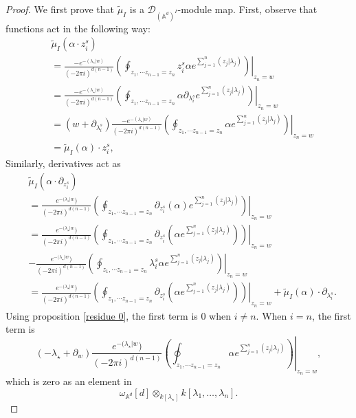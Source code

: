 \documentclass[11pt]{amsart}
\theoremstyle{definition}
\theoremstyle{remark}
\numberwithin{equation}{section}
\begin{document}
\begin{proof}
    We first prove that $\tilde{\mu}_{ I}$ is a $\mathcal{D}_{(\mathbb{A}^{d})^{ I}}$-module map.
    First, observe that functions act in the following way:
    \begin{align*}
        &\tilde{\mu}_{ I}(\alpha\cdot z_{i}^{s})\\
        &=
        \frac{-e^{-(\lambda_{\star}| w)}}{(-2\pi i)^{d(n-1)}}\left.\left(\oint_{z_{1},\cdots z_{n-1}=z_{n}}z_{i}^{s}\alpha e^{\sum\limits_{j=1}^{n}(z_{j}|\lambda_{j})}\right)\right|_{z_n=w}\\
        &=
        \frac{-e^{-(\lambda_{\star}| w)}}{(-2\pi i)^{d(n-1)}}\left.\left(\oint_{z_{1},\cdots z_{n-1}=z_{n}}\alpha \partial_{\lambda_{i}^{s}}e^{\sum\limits_{j=1}^{n}(z_{j}|\lambda_{j})}\right)\right|_{z_n=w}\\
        &=(w+\partial_{\lambda_{i}^{s}})\frac{-e^{-(\lambda_{\star}| w)}}{(-2\pi i)^{d(n-1)}}\left.\left(\oint_{z_{1},\cdots z_{n-1}=z_{n}}\alpha e^{\sum\limits_{j=1}^{n}(z_{j}|\lambda_{j})}\right)\right|_{z_n=w}\\
        &=
        \tilde{\mu}_{ I}(\alpha)\cdot z_{i}^{s},
    \end{align*}
    Similarly, derivatives act as
    \begin{align*}
        &\tilde{\mu}_{ I}(\alpha\cdot \partial_{z_{i}^{s}})\\
        &=
        \frac{e^{-(\lambda_{\star}| w})}{(-2\pi i)^{d(n-1)}}\left.\left(\oint_{z_{1},\cdots z_{n-1}=z_{n}}\partial_{z_{i}^{s}}(\alpha) e^{\sum\limits_{j=1}^{n}(z_{j}|\lambda_{j})}\right)\right|_{z_n=w}\\
        &=
        \frac{e^{-(\lambda_{\star}| w})}{(-2\pi i)^{d(n-1)}}\left.\left(\oint_{z_{1},\cdots z_{n-1}=z_{n}}\partial_{z_{i}^{s}}(\alpha e^{\sum\limits_{j=1}^{n}(z_{j}|\lambda_{j})})\right)\right|_{z_n=w}\\
        &-
        \frac{e^{-(\lambda_{\star}| w})}{(-2\pi i)^{d(n-1)}}\left.\left(\oint_{z_{1},\cdots z_{n-1}=z_{n}}\lambda_{i}^{s}\alpha e^{\sum\limits_{j=1}^{n}(z_{j}|\lambda_{j})}\right)\right|_{z_n=w}\\
        &=
        \frac{e^{-(\lambda_{\star}| w})}{(-2\pi i)^{d(n-1)}}\left.\left(\oint_{z_{1},\cdots z_{n-1}=z_{n}}\partial_{z_{i}^{s}}(\alpha e^{\sum\limits_{j=1}^{n}(z_{j}|\lambda_{j})})\right)\right|_{z_n=w}+
        \tilde{\mu}_{ I}(\alpha)\cdot \partial_{\lambda_{i}^{s}}.
    \end{align*}
    Using proposition \ref{residue 0}, the first term is $0$ when $i\neq n$. When $i=n$, the first term is
    $$
    (-\lambda_{\star}+\partial_{w})\frac{e^{-(\lambda_{\star}| w})}{(-2\pi i)^{d(n-1)}}\left.\left(\oint_{z_{1},\cdots z_{n-1}=z_{n}}\alpha e^{\sum\limits_{j=1}^{n}(z_{j}|\lambda_{j})}\right)\right|_{z_n=w},
    $$
    which is zero as an element in
    $$
    \omega_{\mathbb{A}^{d}}[d]\otimes_{k[\lambda_{\star}]}k[\lambda_{1},\dots,\lambda_{n}].
    $$


\end{proof}
\end{document}
